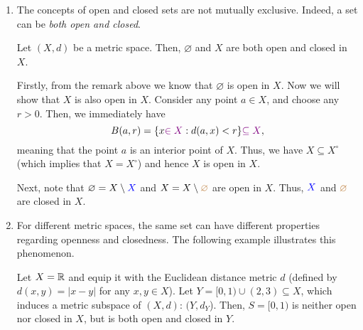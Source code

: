 \begin{enumerate}
\item The concepts of open and closed sets are not mutually exclusive. Indeed,
a set can be \emph{both open and closed}.
\begin{proposition}
\label{prp:both-open-and-closed}
Let \((X,d)\) be a metric space. Then, \(\varnothing\) and \(X\) are both open
and closed in \(X\).
\end{proposition}
\begin{pf}
Firstly, from the remark above we know that \(\varnothing\) is open in \(X\).
Now we will show that \(X\) is also open in \(X\). Consider any point \(a\in
X\), and choose any \(r>0\). Then, we immediately have
\[
B(a,r)=\{x{\color{violet}\in X}:d(a,x)<r\}{\color{violet}\subseteq X},
\]
meaning that the point \(a\) is an interior point of \(X\). Thus, we have
\(X\subseteq X^{\circ}\) (which implies that \(X=X^{\circ}\)) and hence \(X\)
is open in \(X\).

Next, note that \(\varnothing=X\setminus {\color{blue}X}\) and
\(X=X\setminus{\color{brown}\varnothing}\) are open in \(X\). Thus, \({\color{blue}X}\) and
\({\color{brown}\varnothing}\) are closed in \(X\).
\end{pf}

\item For different metric spaces, the same set can have different properties
regarding openness and closedness. The following example illustrates this
phenomenon.

Let \(X=\mathbb{R}\) and equip it with the Euclidean distance metric \(d\) (defined by
\(d(x,y)=|x-y|\) for any \(x,y\in X\)). Let \(Y=[0,1)\cup (2,3)\subseteq X\),
which induces a metric subspace of \((X,d)\): \((Y,d_{Y}\)). Then, \(S=[0,1)\)
is neither open nor closed in \(X\), but is both open and closed in \(Y\).


\end{enumerate}
